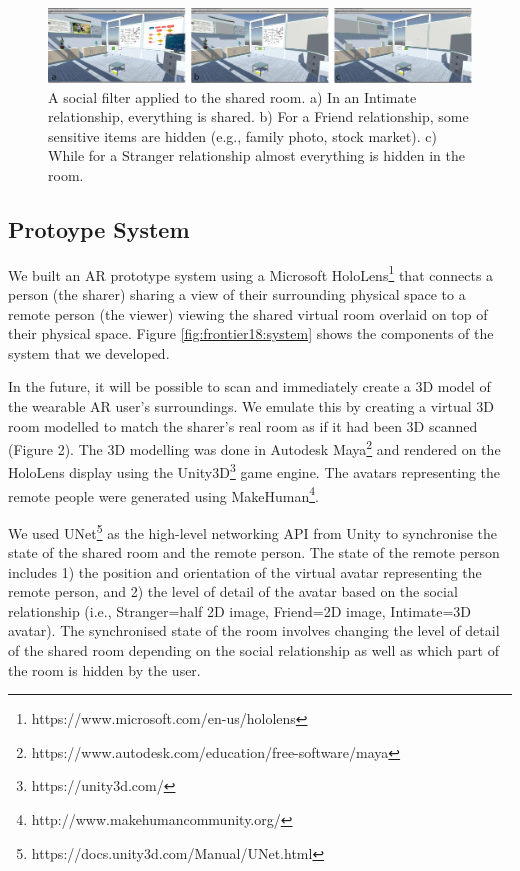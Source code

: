 \begin{figure}
\begin{center}
\includegraphics[width=\linewidth]{images/frontier18/images-02.png}
\caption{A social filter applied to the shared room. a) In an Intimate relationship, everything is shared. b) For a Friend relationship, some sensitive items are hidden (e.g., family photo, stock market). c) While for a Stranger relationship almost everything is hidden in the room.}\label{fig:frontier18:social-filter}
\end{center}
\end{figure}

\subsection{Protoype System}

We built an AR prototype system using a Microsoft HoloLens\footnote{https://www.microsoft.com/en-us/hololens} that connects a person (the sharer) sharing a view of their surrounding physical space to a remote person (the viewer) viewing the shared virtual room overlaid on top of their physical space. Figure \ref{fig:frontier18:system} shows the components of the system that we developed.

In the future, it will be possible to scan and immediately create a 3D model of the wearable AR user's surroundings. We emulate this by creating a virtual 3D room modelled to match the sharer's real room as if it had been 3D scanned (Figure 2).  The 3D modelling was done in Autodesk Maya\footnote{https://www.autodesk.com/education/free-software/maya} and rendered on the HoloLens display using the Unity3D\footnote{https://unity3d.com/} game engine. The avatars representing the remote people were generated using MakeHuman\footnote{http://www.makehumancommunity.org/}.

We used UNet\footnote{https://docs.unity3d.com/Manual/UNet.html} as the high-level networking API from Unity to synchronise the state of the shared room and the remote person. The state of the remote person includes 1) the position and orientation of the virtual avatar representing the remote person, and 2) the level of detail of the avatar based on the social relationship (i.e., Stranger=half 2D image, Friend=2D image, Intimate=3D avatar). The synchronised state of the room involves changing the level of detail of the shared room depending on the social relationship as well as which part of the room is hidden by the user. 

